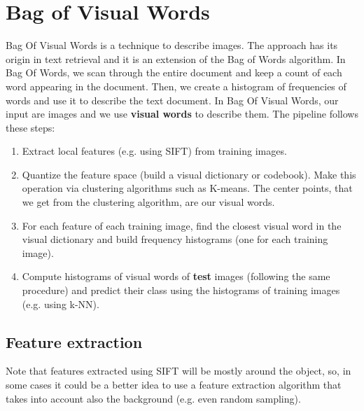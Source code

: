 \section{Bag of Visual Words}
Bag Of Visual Words is a technique to describe images. The approach has its origin in text retrieval and it is an extension of the Bag of Words algorithm. In Bag Of Words, we scan through the entire document and keep a count of each word appearing in the document. Then, we create a histogram of frequencies of words and use it to describe the text document. In Bag Of Visual Words, our input are images and we use \textbf{visual words} to describe them.
\newline\newline
The pipeline follows these steps:
\begin{enumerate}
    \item Extract local features (e.g. using SIFT) from training images.
    \item Quantize the feature space (build a visual dictionary or codebook). Make this operation via clustering algorithms such as K-means. The center points, that we get from the clustering algorithm, are our visual words.
    \item For each feature of each training image, find the closest visual word in the visual dictionary and build frequency histograms (one for each training image).
    \item Compute histograms of visual words of \textbf{test} images (following the same procedure) and predict their class using the histograms of training images (e.g. using k-NN).
\end{enumerate}
\subsection{Feature extraction}
Note that features extracted using SIFT will be mostly around the object, so, in some cases it could be a better idea to use a feature extraction algorithm that takes into account also the background (e.g. even random sampling).
